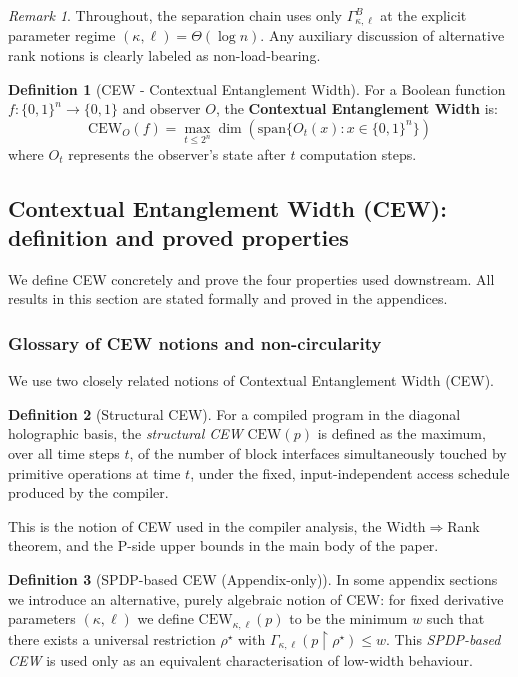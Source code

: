 \documentclass[12pt]{article}
\theoremstyle{definition}
\newtheorem{definition}{Definition}
\theoremstyle{definition}
\theoremstyle{remark}
\newtheorem{remark}{Remark}
\theoremstyle{remark}
\begin{document}
\begin{remark}
Throughout, the separation chain uses only $\Gamma^{B}_{\kappa,\ell}$ at the
explicit parameter regime $(\kappa,\ell)=\Theta(\log n)$. Any auxiliary discussion
of alternative rank notions is clearly labeled as non-load-bearing.
\end{remark}

\begin{definition}[CEW - Contextual Entanglement Width]
For a Boolean function $f: \{0,1\}^n \to \{0,1\}$ and observer $O$, the \textbf{Contextual Entanglement Width} is:
\[
\mathrm{CEW}_O(f) = \max_{t \leq 2^n} \dim(\mathrm{span}\{O_t(x) : x \in \{0,1\}^n\})
\]
where $O_t$ represents the observer's state after $t$ computation steps.
\end{definition}

\subsection{Contextual Entanglement Width (CEW): definition and proved properties}
\label{sec:cew-formal}
We define CEW concretely and prove the four properties used downstream. All results in this section are stated formally and proved in the appendices.

\subsubsection*{Glossary of CEW notions and non-circularity}

We use two closely related notions of Contextual Entanglement Width (CEW).

\begin{definition}[Structural CEW]
\label{def:structural-cew}
For a compiled program in the diagonal holographic basis, the \emph{structural
CEW} $\mathrm{CEW}(p)$ is defined as the maximum, over all time steps $t$, of
the number of block interfaces simultaneously touched by primitive operations
at time $t$, under the fixed, input-independent access schedule produced by
the compiler.
\end{definition}

This is the notion of CEW used in the compiler analysis, the Width$\Rightarrow$Rank
theorem, and the P-side upper bounds in the main body of the paper.

\begin{definition}[SPDP-based CEW (Appendix-only)]
\label{def:spdp-cew}
In some appendix sections we introduce an alternative, purely algebraic
notion of CEW: for fixed derivative parameters $(\kappa,\ell)$ we define
$\mathrm{CEW}_{\kappa,\ell}(p)$ to be the minimum $w$ such that there exists a
universal restriction $\rho^\star$ with $\Gamma_{\kappa,\ell}(p \upharpoonright
\rho^\star) \le w$. This \emph{SPDP-based CEW} is used only as an equivalent
characterisation of low-width behaviour.
\end{definition}
\end{document}
